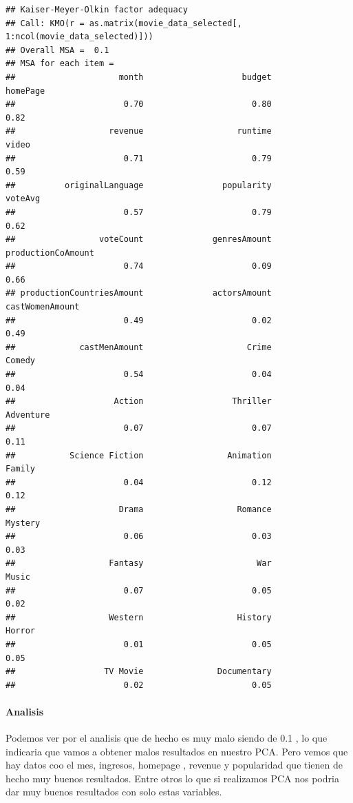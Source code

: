 \documentclass[
]{article}
\begin{document}
\begin{verbatim}
## Kaiser-Meyer-Olkin factor adequacy
## Call: KMO(r = as.matrix(movie_data_selected[, 1:ncol(movie_data_selected)]))
## Overall MSA =  0.1
## MSA for each item = 
##                     month                    budget                  homePage 
##                      0.70                      0.80                      0.82 
##                   revenue                   runtime                     video 
##                      0.71                      0.79                      0.59 
##          originalLanguage                popularity                   voteAvg 
##                      0.57                      0.79                      0.62 
##                 voteCount              genresAmount        productionCoAmount 
##                      0.74                      0.09                      0.66 
## productionCountriesAmount              actorsAmount           castWomenAmount 
##                      0.49                      0.02                      0.49 
##             castMenAmount                     Crime                    Comedy 
##                      0.54                      0.04                      0.04 
##                    Action                  Thriller                 Adventure 
##                      0.07                      0.07                      0.11 
##           Science Fiction                 Animation                    Family 
##                      0.04                      0.12                      0.12 
##                     Drama                   Romance                   Mystery 
##                      0.06                      0.03                      0.03 
##                   Fantasy                       War                     Music 
##                      0.07                      0.05                      0.02 
##                   Western                   History                    Horror 
##                      0.01                      0.05                      0.05 
##                  TV Movie               Documentary 
##                      0.02                      0.05
\end{verbatim}

\paragraph{Analisis}\label{analisis}

Podemos ver por el analisis que de hecho es muy malo siendo de 0.1 , lo
que indicaria que vamos a obtener malos resultados en nuestro PCA. Pero
vemos que hay datos coo el mes, ingresos, homepage , revenue y
popularidad que tienen de hecho muy buenos resultados. Entre otros lo
que si realizamos PCA nos podria dar muy buenos resultados con solo
estas variables.
\end{document}
